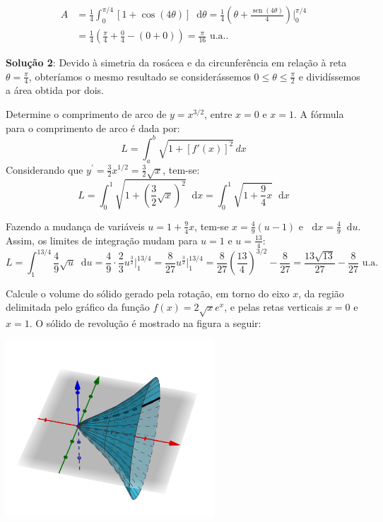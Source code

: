 \documentclass[12pt,a4paper]{article}
\newcommand*\diff{\mathop{}\!\mathrm{d}}
\newcommand*\sen{\operatorname{sen}}
\begin{document}
\begin{ExerciseList}
\begin{align*}
A
& = \frac{1}{4} \int_0^{\pi/4} \left[1 + \cos(4\theta)\right] \diff\theta
= \frac{1}{4} \left(\theta + \frac{\sen(4\theta)}{4}\right)\bigg|_0^{\pi/4} \\
& = \frac{1}{4} \left(\frac{\pi}{4} + \frac{0}{4} - (0 + 0)\right)
= \boxed{\frac{\pi}{16} \text{ u.a.}}.
\end{align*}

\textbf{Solução 2}: Devido à simetria da rosácea e da circunferência em relação à reta $\theta = \frac{\pi}{4}$, obteríamos o mesmo resultado se considerássemos $0 \leq \theta \leq \frac{\pi}{2}$ e dividíssemos a área obtida por dois.


\Exercise[title={2,5}] Determine o comprimento de arco de $y=x^{3/2}$, entre $x=0$ e $x=1$.
\Answer A fórmula para o comprimento de arco é dada por:
\[
  L = \int_a^b \sqrt{1 + [f'(x)]^2} \, dx
\]
Considerando que $y^\prime = \frac{3}{2}x^{1/2} = \frac{3}{2}\sqrt{x}$, tem-se:
\[
  L
  = \int_0^1 \sqrt{1 + \left(\frac{3}{2}\sqrt{x}\right)^2} \diff{x}
  = \int_0^1 \sqrt{1 + \frac{9}{4}x} \diff{x}
\]

Fazendo a mudança de variáveis $u=1 + \frac{9}{4}x$, tem-se $x=\frac{4}{9}(u-1)$ e $\diff{x} = \frac{4}{9}\diff{u}$. Assim, os limites de integração mudam para $u=1$ e $u=\frac{13}{4}$:
\[
  L = \int_1^{13/4} \frac{4}{9}\sqrt{u} \diff{u}
  = \frac{4}{9}\cdot\frac{2}{3}u^{ \frac{3}{2}}\bigg|_1^{13/4}
  = \frac{8}{27}u^{ \frac{3}{2}}\bigg|_1^{13/4}
  = \frac{8}{27} \left(\frac{13}{4}\right)^{3/2} - \frac{8}{27}
  = \boxed{\frac{13\sqrt{13}}{27} - \frac{8}{27} \text{ u.a.}}
\]

\Exercise[title={2,5}] Calcule o volume do sólido gerado pela rotação, em torno do eixo $x$, da região delimitada pelo gráfico da função $f(x) = 2\sqrt{x} e^x$, e pelas retas verticais $x=0$ e $x=1$.
\Answer O sólido de revolução é mostrado na figura a seguir:
\begin{center}
  \includegraphics[height=6.6cm]{img/sólido-de-revolução.png}
\end{center}


\end{ExerciseList}
\end{document}
